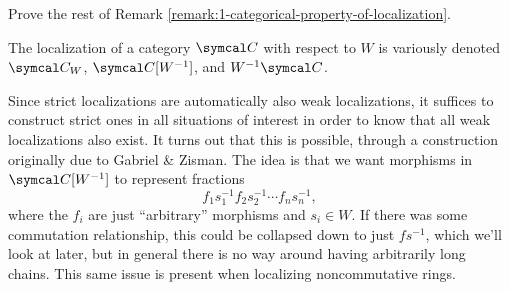 \begin{exercise}
	Prove the rest of Remark \ref{remark:1-categorical-property-of-localization}.
\end{exercise}
\begin{notation}
	The localization of a category \(\calC\) with respect to \(W\) is variously denoted \(\calC_W\), \(\calC[W^{-1}]\), and \(W^{-1}\calC\).
\end{notation}

Since strict localizations are automatically also weak localizations, it suffices to construct strict ones in all situations of interest in order to know that all weak localizations
also exist. It turns out that this is possible, through a construction originally due to Gabriel \& Zisman. The idea is that we want morphisms in \(\calC[W^{-1}]\) to represent
fractions
\[ f_1s_1^{-1}f_2s_2^{-1}\cdots f_ns_n^{-1}, \]
where the \(f_i\) are just ``arbitrary'' morphisms and \(s_i\in W\). If there was some commutation relationship, this could be collapsed down to just \(fs^{-1}\), which we'll look
at later, but in general there is no way around having arbitrarily long chains. This same issue is present when localizing noncommutative rings.
